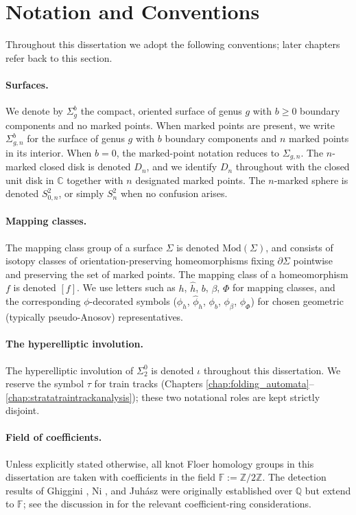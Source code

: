 \section{Notation and Conventions}\label{sec:notation}

Throughout this dissertation we adopt the following conventions; later chapters refer back to this section.

\paragraph{Surfaces.} We denote by $\Sigma_g^b$ the compact, oriented surface of genus $g$ with $b \ge 0$ boundary components and no marked points. When marked points are present, we write $\Sigma_{g,n}^b$ for the surface of genus $g$ with $b$ boundary components and $n$ marked points in its interior. When $b=0$, the marked-point notation reduces to $\Sigma_{g,n}$. The $n$-marked closed disk is denoted $D_n$, and we identify $D_n$ throughout with the closed unit disk in $\mathbb{C}$ together with $n$ designated marked points. The $n$-marked sphere is denoted $S^2_{0,n}$, or simply $S^2_n$ when no confusion arises.

\paragraph{Mapping classes.} The mapping class group of a surface $\Sigma$ is denoted $\mathrm{Mod}(\Sigma)$, and consists of isotopy classes of orientation-preserving homeomorphisms fixing $\partial \Sigma$ pointwise and preserving the set of marked points. The mapping class of a homeomorphism $f$ is denoted $[f]$. We use letters such as $h$, $\hat h$, $b$, $\beta$, $\Phi$ for mapping classes, and the corresponding $\phi$-decorated symbols ($\phi_h$, $\hat{\phi}_h$, $\phi_b$, $\phi_\beta$, $\phi_\Phi$) for chosen geometric (typically pseudo-Anosov) representatives.

\paragraph{The hyperelliptic involution.} The hyperelliptic involution of $\Sigma_2^0$ is denoted $\iota$ throughout this dissertation. We reserve the symbol $\tau$ for train tracks (Chapters \ref{chap:folding_automata}--\ref{chap:stratatraintrackanalysis}); these two notational roles are kept strictly disjoint.

\paragraph{Field of coefficients.} Unless explicitly stated otherwise, all knot Floer homology groups in this dissertation are taken with coefficients in the field $\mathbb{F} := \mathbb{Z}/2\mathbb{Z}$. The detection results of Ghiggini \cite{Ghi08}, Ni \cite{Ni07}, and Juh\'{a}sz \cite{Juh08} were originally established over $\mathbb{Q}$ but extend to $\mathbb{F}$; see the discussion in \cite[\S 2]{baldwin2025khovanov} for the relevant coefficient-ring considerations.

